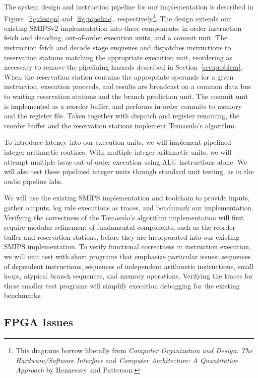 \documentclass[12pt]{article}
\begin{document}
The system design and instruction pipeline for our implementation is described
in Figure~\ref{fig:design} and~\ref{fig:pipeline}, respectively\footnote{This
diagrams borrow liberally from \emph{Computer Organization and Design: The 
Hardware/Software Interface} and \emph{Computer Architecture: A Quantitative 
Approach} by Hennessey and Patterson.}. The design extends our existing SMIPSv2 
implementation into three components: in-order instruction fetch and decoding, 
out-of-order execution units, and a commit unit. The instruction fetch and 
decode stage enqueues and dispatches instructions to reservation stations 
matching the appropriate execution unit, reordering as necessary to remove the 
pipelining hazards described in Section~\ref{sec:problem}. When the reservation 
station contains the appropriate operands for a given instruction, execution 
proceeds, and results are broadcast on a common data bus to waiting reservation 
stations and the branch prediction unit. The commit unit is implemented as a 
reorder buffer, and performs in-order commits to memory and the register file. 
Taken together with dispatch and register renaming, the reorder buffer and the 
reservation stations implement Tomasulo's algorithm.   

To introduce latency into our execution units, we will implement pipelined
integer arithmetic routines. With multiple integer arithmetic units, we will attempt
multiple-issue out-of-order execution using ALU instructions alone. We will also test
these pipelined integer units through standard unit testing, as in the audio pipeline
labs. 

We will use the existing SMIPS implementation and toolchain to provide inputs, gather 
outputs, log rule executions as traces, and benchmark our implementation. Verifying the 
correctness of the Tomasulo's algorithm implementation will first require modular refinement
of fundamental components, such as the reorder buffer and reservation stations, before 
they are incorporated into our existing SMIPS implementation. To verify functional 
correctness in instruction execution, we will unit test with short programs that 
emphasize particular issues: sequences of dependent instructions, sequences of independent
arithmetic instructions, small loops, atypical branch sequences, and memory operations. 
Verifying the traces for these smaller test programs will simplify execution debugging 
for the existing benchmarks. 


\subsection{FPGA Issues}
\end{document}
